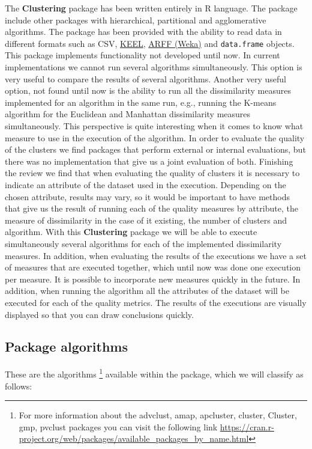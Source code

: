 \documentclass[
]{article}
\begin{document}
The \textbf{Clustering} package has been written entirely in R language.
The package include other packages with hierarchical, partitional and
agglomerative algorithms. The package has been provided with the ability
to read data in different formats such as CSV,
\href{https://sci2s.ugr.es/keel/references.php}{KEEL},
\href{https://www.cs.waikato.ac.nz/ml/weka/}{ARFF (Weka)} and
\texttt{data.frame} objects. This package implements functionality not
developed until now. In current implementations we cannot run several
algorithms simultaneously. This option is very useful to compare the
results of several algorithms. Another very useful option, not found
until now is the ability to run all the dissimilarity measures
implemented for an algorithm in the same run, e.g., running the K-means
algorithm for the Euclidean and Manhattan dissimilarity measures
simultaneously. This perspective is quite interesting when it comes to
know what measure to use in the execution of the algorithm. In order to
evaluate the quality of the clusters we find packages that perform
external or internal evaluations, but there was no implementation that
give us a joint evaluation of both. Finishing the review we find that
when evaluating the quality of clusters it is necessary to indicate an
attribute of the dataset used in the execution. Depending on the chosen
attribute, results may vary, so it would be important to have methods
that give us the result of running each of the quality measures by
attribute, the measure of dissimilarity in the case of it existing, the
number of clusters and algorithm. With this \textbf{Clustering} package
we will be able to execute simultaneously several algorithms for each of
the implemented dissimilarity measures. In addition, when evaluating the
results of the executions we have a set of measures that are executed
together, which until now was done one execution per measure. It is
possible to incorporate new measures quickly in the future. In addition,
when running the algorithm all the attributes of the dataset will be
executed for each of the quality metrics. The results of the executions
are visually displayed so that you can draw conclusions quickly.

\hypertarget{package-algorithms}{%
\subsection{Package algorithms}\label{package-algorithms}}

These are the algorithms
\footnote{For more information about the advclust, amap, apcluster, cluster, Cluster, gmp, pvclust packages you can visit the following link \url{https://cran.r-project.org/web/packages/available_packages_by_name.html}}
available within the package, which we will classify as follows:
\end{document}
